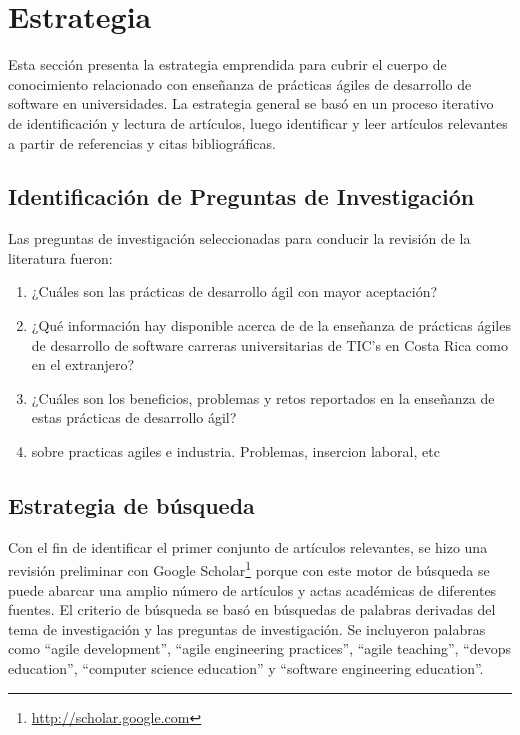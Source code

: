 \documentclass[journal]{IEEEtran}
\begin{document}
\section{Estrategia} \label{sec:estrategia}
Esta sección presenta la estrategia emprendida para cubrir el cuerpo de conocimiento relacionado con enseñanza de prácticas ágiles de desarrollo de software en universidades. La estrategia general se basó en un proceso iterativo de identificación y lectura de artículos, luego identificar y leer artículos relevantes a partir de referencias y citas bibliográficas.

\subsection{Identificación de Preguntas de Investigación}
Las preguntas de investigación seleccionadas para conducir la revisión de la literatura fueron:
\begin{enumerate}
    \item ¿Cuáles son las prácticas de desarrollo ágil con mayor aceptación?
    \item ¿Qué información hay disponible acerca de de la enseñanza de prácticas ágiles de desarrollo de software carreras universitarias de TIC's en Costa Rica como en el extranjero? 
    \item ¿Cuáles son los beneficios, problemas y retos reportados en la enseñanza de estas prácticas de desarrollo ágil?
    \item sobre practicas agiles e industria. Problemas, insercion laboral, etc
\end{enumerate}

\subsection{Estrategia de búsqueda}
Con el fin de identificar el primer conjunto de artículos relevantes, se hizo una revisión preliminar con Google Scholar\footnote{\url{http://scholar.google.com}} porque con este motor de búsqueda se puede abarcar una amplio número de artículos y actas académicas de diferentes fuentes. El criterio de búsqueda se basó en búsquedas de palabras derivadas del tema de investigación y las preguntas de investigación. Se incluyeron palabras como ``agile development'', ``agile engineering practices'', ``agile teaching'', ``devops education'', ``computer science education'' y ``software engineering education''. 
\end{document}
